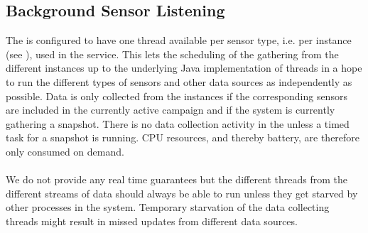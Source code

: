 \subsection{Background Sensor Listening}
The  is configured to have one thread available per sensor type, i.e. per  instance (see ), used in the service. This lets the scheduling of the gathering from the different  instances up to the underlying Java implementation of threads in a hope to run the different types of sensors and other data sources as independently as possible. Data is only collected from the  instances if the corresponding sensors are included in the currently active campaign and if the system is currently gathering a snapshot. There is no data collection activity in the  unless a timed task for a snapshot is running. CPU resources, and thereby battery, are therefore only consumed on demand.
\\\\
We do not provide any real time guarantees but the different threads from the different streams of data should always be able to run unless they get starved by other processes in the system. Temporary starvation of the data collecting threads might result in missed updates from different data sources. 

